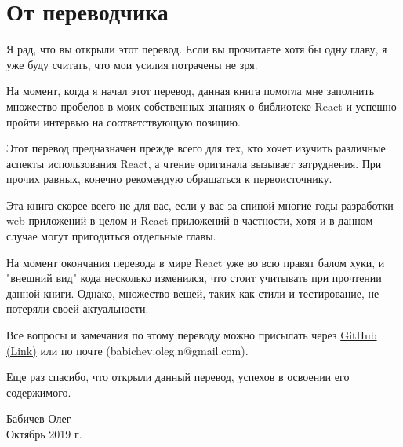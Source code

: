 \section*{От переводчика}

Я рад, что вы открыли этот перевод. Если вы прочитаете хотя бы одну главу, я уже буду считать, что мои усилия потрачены не зря.

На момент, когда я начал этот перевод, данная книга помогла мне заполнить множество пробелов в моих собственных знаниях о библиотеке React и успешно пройти интервью на соответствующую позицию. 

Этот перевод предназначен прежде всего для тех, кто хочет изучить различные аспекты использования React, а чтение оригинала вызывает затруднения. При прочих равных, конечно рекомендую обращаться к первоисточнику.

Эта книга скорее всего не для вас, если у вас за спиной многие годы разработки web приложений в целом и React приложений в частности, хотя и в данном случае могут пригодиться отдельные главы. 

На момент окончания перевода в мире React уже во всю правят балом хуки, и "внешний вид" кода несколько изменился, что стоит учитывать при прочтении данной книги. Однако, множество вещей, таких как стили и тестирование, не потеряли своей актуальности.

Все вопросы и замечания по этому переводу можно присылать через \href{https://github.com/obabichev/React-Design-Patterns-and-Best-Practices-Rus}{GitHub (Link)} или по почте (babichev.oleg.n@gmail.com).

Еще раз спасибо, что открыли данный перевод, успехов в освоении его содержимого.

\begin{flushright}
Бабичев Олег \\
Октябрь 2019 г.
\end{flushright}
